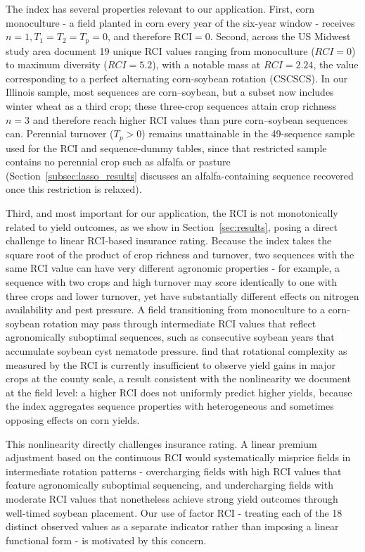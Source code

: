 \documentclass[12pt,letterpaper]{article}
\theoremstyle{remark}
\theoremstyle{remark}
\theoremstyle{plain}
\theoremstyle{definition}
\begin{document}
The index has several properties relevant to our application. First, corn monoculture - a field planted in corn every year of the six-year window - receives $n=1, T_{1}=T_{2}=T_{p}=0$, and therefore $\text{RCI} = 0$. Second, across the US Midwest study area \citet{socolar2021} document 19 unique RCI values ranging from monoculture ($RCI = 0$) to maximum diversity ($RCI = 5.2$), with a notable mass at $RCI = 2.24$, the value corresponding to a perfect alternating corn-soybean rotation (CSCSCS). In our Illinois sample, most sequences are corn--soybean, but a subset now includes winter wheat as a third crop; these three-crop sequences attain crop richness $n = 3$ and therefore reach higher RCI values than pure corn--soybean sequences can. Perennial turnover ($T_{p} > 0$) remains unattainable in the 49-sequence sample used for the RCI and sequence-dummy tables, since that restricted sample contains no perennial crop such as alfalfa or pasture (Section~\ref{subsec:lasso_results} discusses an alfalfa-containing sequence recovered once this restriction is relaxed). %

Third, and most important for our application, the RCI is not monotonically related to yield outcomes, as we show in Section~\ref{sec:results}, posing a direct challenge to linear RCI-based insurance rating. Because the index takes the square root of the product of crop richness and turnover, two sequences with the same RCI value can have very different agronomic properties - for example, a sequence with two crops and high turnover may score identically to one with three crops and lower turnover, yet have substantially different effects on nitrogen availability and pest pressure. A field transitioning from monoculture to a corn-soybean rotation may pass through intermediate RCI values that reflect agronomically suboptimal sequences, such as consecutive soybean years that accumulate soybean cyst nematode pressure. \citet{burchfield2024} find that rotational complexity as measured by the RCI is currently insufficient to observe yield gains in major crops at the county scale, a result consistent with the nonlinearity we document at the field level: a higher RCI does not uniformly predict higher yields, because the index aggregates sequence properties with heterogeneous and sometimes opposing effects on corn yields.

This nonlinearity directly challenges insurance rating. A linear premium adjustment based on the continuous RCI would systematically misprice fields in intermediate rotation patterns - overcharging fields with high RCI values that feature agronomically suboptimal sequencing, and undercharging fields with moderate RCI values that nonetheless achieve strong yield outcomes through well-timed soybean placement. Our use of factor RCI - treating each of the 18 distinct observed values as a separate indicator rather than imposing a linear functional form - is motivated by this concern. 
\end{document}
